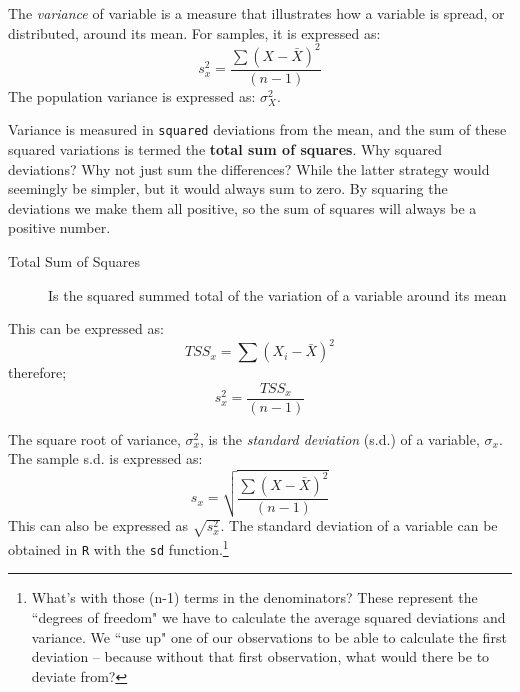 \documentclass[11pt,openany]{book}
\begin{document}
{The \textit{variance} of variable is a measure that illustrates how a variable is spread, or distributed, around its mean. For samples, it is expressed as:  
\begin{equation}
s^{2}_{x}=\frac{\sum (X-\bar{X})^{2}}{(n-1)}  
\end{equation}
The population variance is expressed as: $\sigma^{2}_{X}$. 

Variance is measured in \texttt{squared} deviations from the mean, and the sum of these squared variations is termed the \textbf{total sum of squares}. Why squared deviations? Why not just sum the differences? While the latter strategy would seemingly be simpler, but it would always sum to zero. By squaring the deviations we make them all positive, so the sum of squares will always be a positive number.

\begin{description}
\item[Total Sum of Squares] Is the squared summed total of the variation of a variable around its mean
\end{description}
This can be expressed as: 
\begin{equation}
TSS_{x} = \sum(X_{i}-\bar{X})^{2}   
\end{equation}
therefore; 
\begin{equation}
s^{2}_{x} = \frac{TSS_{x}}{(n-1)}  
\end{equation}

The square root of variance, $\sigma^{2}_{x}$, is the \textit{standard deviation} (s.d.) of a variable, $\sigma_{x}$. The sample s.d. is expressed as: 
\begin{equation}
s_{x} = \sqrt{\frac{\sum(X-\bar{X})^{2}}{(n-1)}}  
\end{equation}
This can also be expressed as $\sqrt{s^2_{x}}$.  The standard deviation of a variable can be obtained in \texttt{R} with the \texttt{sd} function.\footnote{What's with those (n-1) terms in the denominators? These represent the ``degrees of freedom" we have to calculate the average squared deviations and variance. We ``use up" one of our observations to be able to calculate the first deviation -- because without that first observation, what would there be to deviate from?}

}
\end{document}
